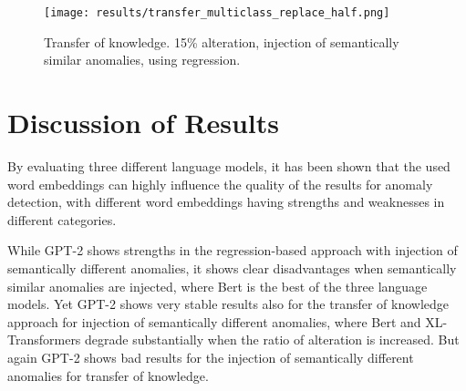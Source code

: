 \begin{comment}
\begin{figure*}[ht!]
   \subfloat[Bert\label{fig:roc_curve_bert_transfer_multiclass}]{%
      \texttt{[image: results/transfer/roc\_curve\_transfer\_multiclass\_bert\_0.15.png]}}
\hspace{\fill}
   \subfloat[GPT-2\label{fig:roc_curve_gpt_transfer_multiclass} ]{%
      \texttt{[image: results/transfer/roc\_curve\_transfer\_multiclass\_gpt\_0.15.png]}}
\hspace{\fill}
   \subfloat[XL\label{fig:roc_curve_xl_transfer_multiclass}]{%
      \texttt{[image: results/transfer/roc\_curve\_transfer\_multiclass\_xl\_0.15.png]}}\\
\caption{\label{fig:results_transfer_multiclass_roc}ROC-Curve for transfer of knowledge using regression with 15\% alterations.}
\end{figure*}
\end{comment}

\begin{figure}[h]
  \centering
  \captionsetup{justification=centering}
  \texttt{[image: results/transfer\_multiclass\_replace\_half.png]}\\
  \caption{Transfer of knowledge. 15\% alteration, injection of semantically similar anomalies, using regression.}
  \label{fig:replace_words_classification_transfer}
\end{figure}

\clearpage
\section{Discussion of Results\label{sec:discussion_results}}
By evaluating three different language models, it has been shown that the used word embeddings can highly influence the quality of the results for anomaly detection, with different word embeddings having strengths and weaknesses in different categories.

While GPT-2 shows strengths in the regression-based approach with injection of semantically different anomalies, it shows clear disadvantages when semantically similar anomalies are injected, where Bert is the best of the three language models. Yet GPT-2 shows very stable results also for the transfer of knowledge approach for injection of semantically different anomalies, where Bert and XL-Transformers degrade substantially when the ratio of alteration is increased. But again GPT-2 shows bad results for the injection of semantically different anomalies for transfer of knowledge.

